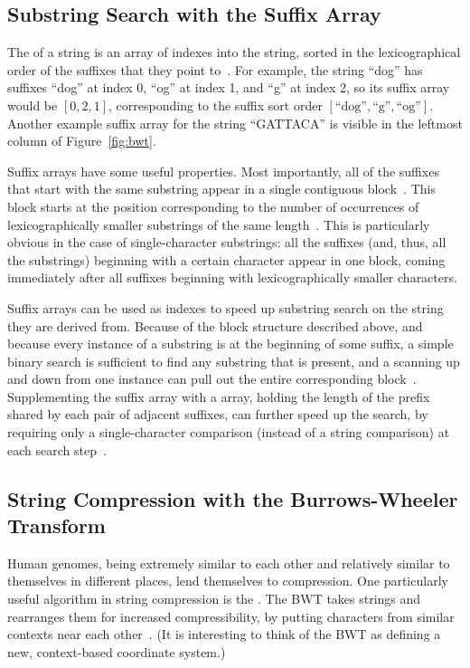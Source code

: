 \subsection{Substring Search with the Suffix Array}

The  of a string is an array of indexes into the string, sorted in the lexicographical order of the suffixes that they point to~\cite{manber1993suffix}. For example, the string ``dog'' has suffixes ``dog'' at index 0, ``og'' at index 1, and ``g'' at index 2, so its suffix array would be $[0, 2, 1]$, corresponding to the suffix sort order $[\textrm{``dog''}, \textrm{``g''}, \textrm{``og''}]$. Another example suffix array for the string ``GATTACA'' is visible in the leftmost column of Figure~\ref{fig:bwt}.

Suffix arrays have some useful properties. Most importantly, all of the suffixes that start with the same substring appear in a single contiguous block~\cite{ferragina2000opportunistic}. This block starts at the position corresponding to the number of occurrences of lexicographically smaller substrings of the same length~\cite{ferragina2000opportunistic}. This is particularly obvious in the case of single-character substrings: all the suffixes (and, thus, all the substrings) beginning with a certain character appear in one block, coming immediately after all suffixes beginning with lexicographically smaller characters.

Suffix arrays can be used as indexes to speed up substring search on the string they are derived from. Because of the block structure described above, and because every instance of a substring is at the beginning of some suffix, a simple binary search is sufficient to find any substring that is present, and a scanning up and down from one instance can pull out the entire corresponding block~\cite{manber1993suffix}. Supplementing the suffix array with a  array, holding the length of the prefix shared by each pair of adjacent suffixes, can further speed up the search, by requiring only a single-character comparison (instead of a string comparison) at each search step~\cite{manber1993suffix}.

\subsection{String Compression with the Burrows-Wheeler Transform}
\label{subsec:bwt}

Human genomes, being extremely similar to each other and relatively similar to themselves in different places, lend themselves to compression. One particularly useful algorithm in string compression is the . The BWT takes strings and rearranges them for increased compressibility, by putting characters from similar contexts near each other~\cite{burrows1994block}. (It is interesting to think of the BWT as defining a new, context-based coordinate system.)


